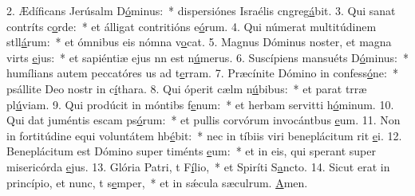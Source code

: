 2. Ædíficans Jerúsalm D\uline{ó}minus:~* dispersiónes Israélis cngreg\uline{á}bit.
3. Qui sanat contríts c\uline{o}rde:~* et álligat contritións e\uline{ó}rum.
4. Qui númerat multitúdinem stll\uline{á}rum:~* et ómnibus eis nómna v\uline{o}cat.
5. Magnus Dóminus noster, et magna virts \uline{e}jus:~* et sapiéntiæ ejus nn est n\uline{ú}merus.
6. Suscípiens mansuéts D\uline{ó}minus:~* humílians autem peccatóres us ad t\uline{e}rram.
7. Præcínite Dómino in confess\uline{ó}ne:~* psállite Deo nostr in c\uline{í}thara.
8. Qui óperit cælm n\uline{ú}bibus:~* et parat trræ pl\uline{ú}viam.
9. Qui prodúcit in móntibs f\uline{e}num:~* et herbam servitti h\uline{ó}minum.
10. Qui dat juméntis escam ps\uline{ó}rum:~* et pullis corvórum invocántbus \uline{e}um.
11. Non in fortitúdine equi voluntátem hb\uline{é}bit:~* nec in tíbiis viri beneplácitum rit \uline{e}i.
12. Beneplácitum est Dómino super timénts \uline{e}um:~* et in eis, qui sperant super misericórda \uline{e}jus.
13. Glória Patri, t F\uline{í}lio,~* et Spiríti S\uline{a}ncto.
14. Sicut erat in princípio, et nunc, t s\uline{e}mper,~* et in sǽcula sæculrum. \uline{A}men.
